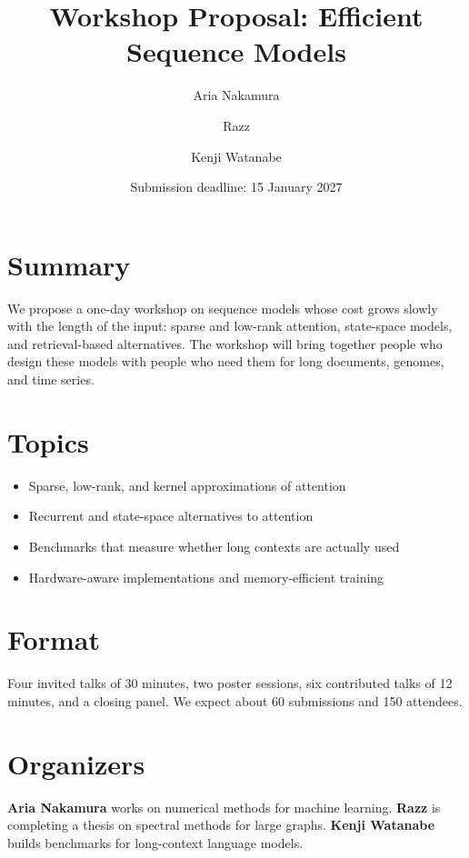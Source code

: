 \documentclass[11pt,a4paper]{article}
\title{Workshop Proposal: Efficient Sequence Models}
\author{Aria Nakamura \and Razz \and Kenji Watanabe}
\date{Submission deadline: 15 January 2027}
\begin{document}
\maketitle

\section{Summary}

We propose a one-day workshop on sequence models whose cost grows slowly with the length of the input: sparse and low-rank attention, state-space models, and retrieval-based alternatives. The workshop will bring together people who design these models with people who need them for long documents, genomes, and time series.

\section{Topics}

\begin{itemize}[leftmargin=1.5em]
  \item Sparse, low-rank, and kernel approximations of attention
  \item Recurrent and state-space alternatives to attention
  \item Benchmarks that measure whether long contexts are actually used
  \item Hardware-aware implementations and memory-efficient training
\end{itemize}

\section{Format}

Four invited talks of 30 minutes, two poster sessions, six contributed talks of 12 minutes, and a closing panel. We expect about 60 submissions and 150 attendees.

\section{Organizers}

\textbf{Aria Nakamura} works on numerical methods for machine learning. \textbf{Razz} is completing a thesis on spectral methods for large graphs. \textbf{Kenji Watanabe} builds benchmarks for long-context language models.
\end{document}
